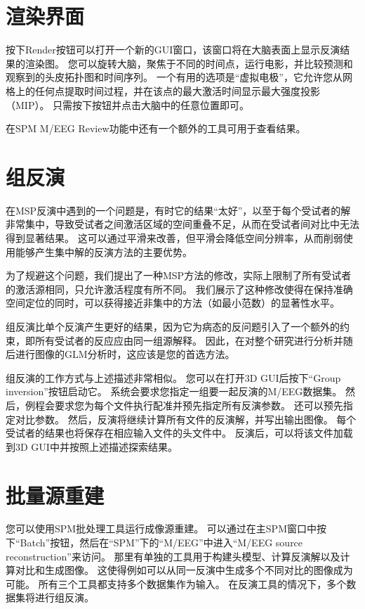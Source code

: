 \section{渲染界面}

按下Render按钮可以打开一个新的GUI窗口，该窗口将在大脑表面上显示反演结果的渲染图。
您可以旋转大脑，聚焦于不同的时间点，运行电影，并比较预测和观察到的头皮拓扑图和时间序列。
一个有用的选项是“虚拟电极”，它允许您从网格上的任何点提取时间过程，并在该点的最大激活时间显示最大强度投影（MIP）。
只需按下按钮并点击大脑中的任意位置即可。

在SPM M/EEG Review功能中还有一个额外的工具可用于查看结果。


\section{组反演}

在MSP反演中遇到的一个问题是，有时它的结果“太好”，以至于每个受试者的解非常集中，导致受试者之间激活区域的空间重叠不足，从而在受试者间对比中无法得到显著结果。
这可以通过平滑来改善，但平滑会降低空间分辨率，从而削弱使用能够产生集中解的反演方法的主要优势。

为了规避这个问题，我们提出了一种MSP方法的修改，实际上限制了所有受试者的激活源相同，只允许激活程度有所不同。
我们展示了这种修改使得在保持准确空间定位的同时，可以获得接近非集中的方法（如最小范数）的显著性水平。

组反演比单个反演产生更好的结果，因为它为病态的反问题引入了一个额外的约束，即所有受试者的反应应由同一组源解释。
因此，在对整个研究进行分析并随后进行图像的GLM分析时，这应该是您的首选方法。

组反演的工作方式与上述描述非常相似。
您可以在打开3D GUI后按下“Group inversion”按钮启动它。
系统会要求您指定一组要一起反演的M/EEG数据集。
然后，例程会要求您为每个文件执行配准并预先指定所有反演参数。
还可以预先指定对比参数。
然后，反演将继续计算所有文件的反演解，并写出输出图像。
每个受试者的结果也将保存在相应输入文件的头文件中。
反演后，可以将该文件加载到3D GUI中并按照上述描述探索结果。


\section{批量源重建}

您可以使用SPM批处理工具运行成像源重建。
可以通过在主SPM窗口中按下“Batch”按钮，然后在“SPM”下的“M/EEG”中进入“M/EEG source reconstruction”来访问。
那里有单独的工具用于构建头模型、计算反演解以及计算对比和生成图像。
这使得例如可以从同一反演中生成多个不同对比的图像成为可能。
所有三个工具都支持多个数据集作为输入。
在反演工具的情况下，多个数据集将进行组反演。



